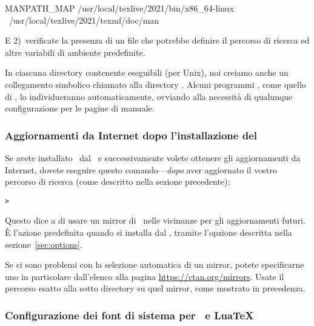 \documentclass{article}
\begin{document}
\begin{sverbatim}
MANPATH_MAP /usr/local/texlive/2021/bin/x86_64-linux \
            /usr/local/texlive/2021/texmf/doc/man
\end{sverbatim}

E 2)~verificate la presenza di un file  che
potrebbe definire il percorso di ricerca ed altre variabili di ambiente
predefinite.

In ciascuna directory contenente eseguibili (per Unix), noi creiamo anche
un collegamento simbolico chiamato  alla directory
. Alcuni programmi \code{man}, come quello di
\MacOSX, lo individueranno automaticamente, ovviando alla necessità di
qualunque configurazione per le pagine di manuale.


\subsubsection{Aggiornamenti da Internet dopo l'installazione del \DVD}
\label{sec:dvd-install-net-updates}

Se avete installato \TL\ dal \DVD\ e successivamente volete ottenere gli
aggiornamenti da Internet, dovete eseguire questo comando---\emph{dopo} aver
aggiornato il vostro percorso di ricerca (come descritto nella sezione
precedente):

\begin{alltt}
> 
\end{alltt}

Questo dice a  di usare un mirror di \CTAN\ nelle vicinanze
per gli aggiornamenti futuri. È l'azione predefinita quando si installa dal
\DVD, tramite l'opzione descritta nella sezione~\ref{sec:options}.

Se ci sono problemi con la selezione automatica di un mirror, potete
specificarne uno in particolare dall'elenco alla pagina
\url{https://ctan.org/mirrors}. Usate il percorso esatto alla sotto directory
\dirname{tlnet} su quel mirror, come mostrato in precedenza.


\htmlanchor{sysfontconfig}
\subsubsection{Configurazione dei font di sistema per \protect\XeTeX\protect\ e Lua\protect\TeX}
\label{sec:font-conf-sys}
\end{document}
